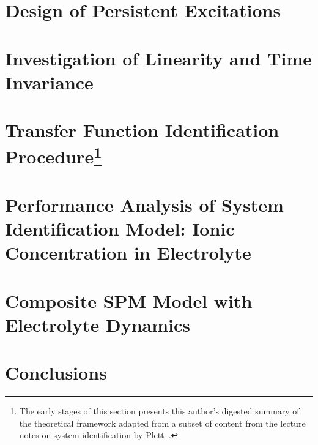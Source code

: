 \section{Design of Persistent Excitations}\label{sec:persistentexcitation}


\section{Investigation of Linearity and Time Invariance}\label{sec:lticheck}


\vspace*{-2mm}
\section[Transfer Function Identification Procedure]{Transfer Function Identification Procedure\footnote{The early stages of this section presents this author's digested summary of the theoretical framework adapted from a subset of content from the lecture notes on system identification by Plett~\cite{PlettECE5560_02,PlettECE5560_03,PlettECE5560_04}.}}\label{sec:actualsysid}


\section[Performance Analysis of System Id Model: Ionic Concentration]{Performance Analysis of System Identification Model: Ionic Concentration in Electrolyte}\label{sec:perfanalysisnewmodel}


\section{Composite SPM Model with Electrolyte Dynamics}


\section{Conclusions}

